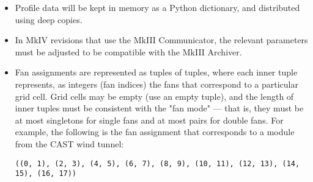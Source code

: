 \documentclass{article}
\begin{document}
\begin{itemize}
\item Profile data will be kept in memory as a Python dictionary, and
    distributed using deep copies.
\item In MkIV revisions that use the MkIII Communicator, the relevant
    parameters must be adjusted to be compatible with the MkIII Archiver.
\item Fan assignments are represented as tuples of tuples, where each inner
    tuple represents, as integers (fan indices) the fans that correspond to
    a particular grid cell. Grid cells may be empty (use an empty tuple), and
    the length of inner tuples must be consistent with the "fan mode" --- that
    is, they must be at most singletons for single fans and at most pairs for
    double fans.
    For example, the following is the fan assignment that corresponds to a
    module from the CAST wind tunnel:

    \texttt{((0, 1), (2, 3), (4, 5), (6, 7), (8, 9), (10, 11),
        (12, 13), (14, 15), (16, 17))}
\end{itemize}
\end{document}
